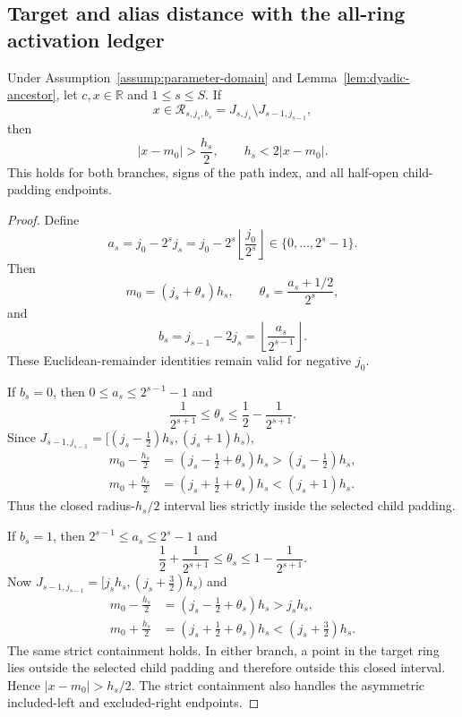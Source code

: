 \subsection{Target and alias distance with the all-ring activation ledger}

\begin{lemma}
\label{lem:target-distance}
Under Assumption~\ref{assump:parameter-domain} and
Lemma~\ref{lem:dyadic-ancestor}, let $c,x\in\mathbb R$ and
$1\leq s\leq S$.  If
\[
 x\in\mathcal R_{s,j_s,b_s}
 =J_{s,j_s}\setminus J_{s-1,j_{s-1}},
\]
then
\[
 |x-m_0|>\frac{h_s}{2},\qquad h_s<2|x-m_0|.
\]
This holds for both branches, signs of the path index, and all half-open
child-padding endpoints.
\end{lemma}

\begin{proof}
Define
\[
 a_s=j_0-2^sj_s
 =j_0-2^s\left\lfloor\frac{j_0}{2^s}\right\rfloor
 \in\{0,\ldots,2^s-1\}.
\]
Then
\[
 m_0=(j_s+\theta_s)h_s,
 \qquad \theta_s=\frac{a_s+1/2}{2^s},
\]
and
\[
 b_s=j_{s-1}-2j_s
 =\left\lfloor\frac{a_s}{2^{s-1}}\right\rfloor.
\]
These Euclidean-remainder identities remain valid for negative $j_0$.

If $b_s=0$, then $0\leq a_s\leq2^{s-1}-1$ and
\[
 \frac1{2^{s+1}}\leq\theta_s
 \leq\frac12-\frac1{2^{s+1}}.
\]
Since
$J_{s-1,j_{s-1}}=[(j_s-\tfrac12)h_s,(j_s+1)h_s)$,
\[
\begin{aligned}
 m_0-\frac{h_s}{2}&=(j_s-\tfrac12+\theta_s)h_s
 >(j_s-\tfrac12)h_s,\\
 m_0+\frac{h_s}{2}&=(j_s+\tfrac12+\theta_s)h_s
 <(j_s+1)h_s.
\end{aligned}
\]
Thus the closed radius-$h_s/2$ interval lies strictly inside the selected
child padding.

If $b_s=1$, then $2^{s-1}\leq a_s\leq2^s-1$ and
\[
 \frac12+\frac1{2^{s+1}}\leq\theta_s
 \leq1-\frac1{2^{s+1}}.
\]
Now $J_{s-1,j_{s-1}}=[j_sh_s,(j_s+\tfrac32)h_s)$ and
\[
\begin{aligned}
 m_0-\frac{h_s}{2}&=(j_s-\tfrac12+\theta_s)h_s>j_sh_s,\\
 m_0+\frac{h_s}{2}&=(j_s+\tfrac12+\theta_s)h_s
 <(j_s+\tfrac32)h_s.
\end{aligned}
\]
The same strict containment holds.  In either branch, a point in the target
ring lies outside the selected child padding and therefore outside this closed
interval.  Hence $|x-m_0|>h_s/2$.  The strict containment also handles the
asymmetric included-left and excluded-right endpoints.
\end{proof}

